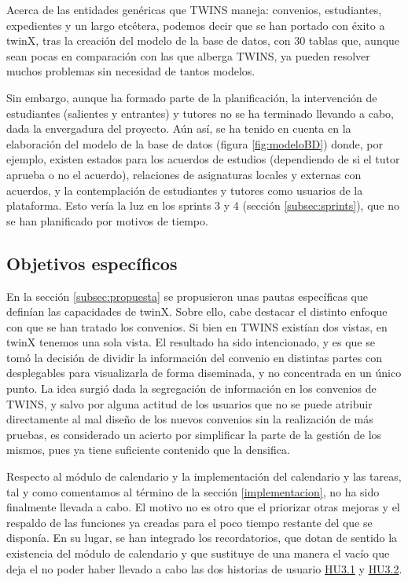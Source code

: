 Acerca de las entidades genéricas que TWINS maneja: convenios, estudiantes, expedientes y un largo etcétera, podemos decir que se han portado con éxito a twinX, tras la creación del modelo de la base de datos, con 30 tablas que, aunque sean pocas en comparación con las que alberga TWINS, ya pueden resolver muchos problemas sin necesidad de tantos modelos. 

Sin embargo, aunque ha formado parte de la planificación, la intervención de estudiantes (salientes y entrantes) y tutores no se ha terminado llevando a cabo, dada la envergadura del proyecto. Aún así, se ha tenido en cuenta en la elaboración del modelo de la base de datos (figura  \ref{fig:modeloBD}) donde, por ejemplo, existen estados para los acuerdos de estudios (dependiendo de si el tutor aprueba o no el acuerdo), relaciones de asignaturas locales y externas con acuerdos, y la contemplación de estudiantes y tutores como usuarios de la plataforma. Esto vería la luz en los sprints 3 y 4 (sección \ref{subsec:sprints}), que no se han planificado por motivos de tiempo.

\subsection{Objetivos específicos}

En la sección \ref{subsec:propuesta} se propusieron unas pautas específicas que definían las capacidades de twinX. Sobre ello, cabe destacar el distinto enfoque con que se han tratado los convenios. Si bien en TWINS existían dos vistas, en twinX tenemos una sola vista. El resultado ha sido intencionado, y es que se tomó la decisión de dividir la información del convenio en distintas partes con desplegables para visualizarla de forma diseminada, y no concentrada en un único punto. La idea surgió dada la segregación de información en los convenios de TWINS, y salvo por alguna actitud de los usuarios que no se puede atribuir directamente al mal diseño de los nuevos convenios sin la realización de más pruebas, es considerado un acierto por simplificar la parte de la gestión de los mismos, pues ya tiene suficiente contenido que la densifica.

Respecto al módulo de calendario y la implementación del calendario y las tareas, tal y como comentamos al término de la sección \ref{implementacion}, no ha sido finalmente llevada a cabo. El motivo no es otro que el priorizar otras mejoras y el respaldo de las funciones ya creadas para el poco tiempo restante del que se disponía. En su lugar, se han integrado los recordatorios, que dotan de sentido la existencia del módulo de calendario y que sustituye de una manera el vacío que deja el no poder haber llevado a cabo las dos historias de usuario \hyperref[tab:HU3.1]{HU3.1} y \hyperref[tab:HU3.2]{HU3.2}.

